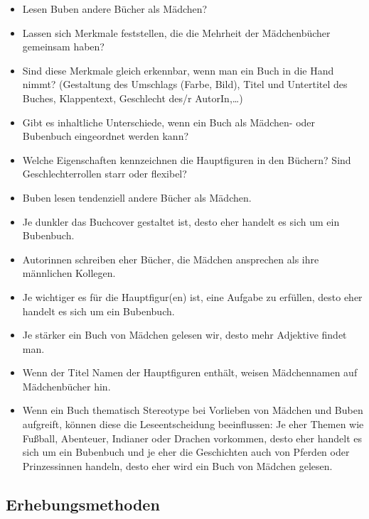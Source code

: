   \begin{itemize} 
      
    \item Lesen Buben andere Bücher als Mädchen?     
    \item Lassen sich Merkmale feststellen, die die Mehrheit der Mädchenbücher gemeinsam haben?     
    \item Sind diese Merkmale gleich erkennbar, wenn man ein Buch in die Hand nimmt? (Gestaltung des Umschlags (Farbe, Bild), Titel und Untertitel des  Buches, Klappentext, Geschlecht des/r AutorIn,\ldots)     
    \item Gibt es inhaltliche Unterschiede, wenn ein Buch als Mädchen- oder Bubenbuch eingeordnet werden kann?      
    \item Welche Eigenschaften kennzeichnen die Hauptfiguren in den Büchern? Sind Geschlechterrollen starr oder flexibel?   

  \end{itemize}

     \begin{itemize}     \item Buben lesen tendenziell
andere Bücher als Mädchen.     \item Je dunkler das Buchcover gestaltet ist,
desto eher handelt es sich um ein Bubenbuch.     \item Autorinnen schreiben eher
Bücher, die Mädchen ansprechen als ihre männlichen Kollegen.     \item Je
wichtiger es für die Hauptfigur(en) ist, eine Aufgabe zu erfüllen, desto eher
handelt es sich um ein Bubenbuch.     \item Je stärker ein Buch von Mädchen
gelesen wir, desto mehr Adjektive findet man.     \item Wenn der Titel Namen der
Hauptfiguren enthält, weisen Mädchennamen auf Mädchenbücher hin.     \item Wenn
ein Buch thematisch Stereotype bei Vorlieben von Mädchen und Buben aufgreift,
können diese die Leseentscheidung beeinflussen: Je eher Themen wie Fußball,
Abenteuer, Indianer oder Drachen vorkommen, desto eher handelt es sich um ein
Bubenbuch und je eher die Geschichten  auch von Pferden oder Prinzessinnen
handeln, desto eher wird ein Buch von Mädchen gelesen.   \end{itemize}

  \subsection{Erhebungsmethoden}

